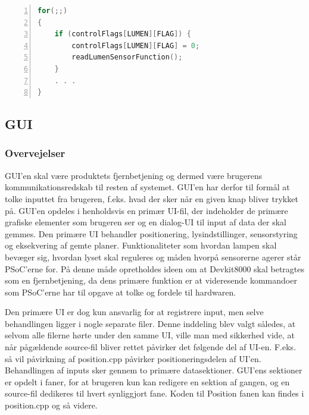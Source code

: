 \begin{lstlisting}[frame=single, basicstyle=\footnotesize\ttfamily, language=C, numbers=left, numberstyle=\tiny\color{black}, caption={Pseudokode: Flag i hovedløkken},captionpos=b]
for(;;)
{
    if (controlFlags[LUMEN][FLAG]) {
        controlFlags[LUMEN][FLAG] = 0;
        readLumenSensorFunction();
    }
	. . . 
}
\end{lstlisting}

\subsection{GUI}

\subsubsection{Overvejelser}

GUI’en skal være produktets fjernbetjening og dermed være brugerens kommunikationsredskab til resten af systemet. GUI’en har derfor til formål at tolke inputtet fra brugeren, f.eks. hvad der sker når en given knap bliver trykket på. 
GUI’en opdeles i henholdsvis en primær UI-fil, der indeholder de primære grafiske elementer som brugeren ser og en dialog-UI til input af data der skal gemmes. Den primære UI behandler positionering, lysindstillinger, sensorstyring og eksekvering af gemte planer. Funktionaliteter som hvordan lampen skal bevæger sig, hvordan lyset skal reguleres og måden hvorpå sensorerne agerer står PSoC'erne for. På denne måde opretholdes ideen om at Devkit8000 skal betragtes som en fjernbetjening, da dens primære funktion er at videresende kommandoer som PSoC'erne har til opgave at tolke og fordele til hardwaren.
\newline

Den primære UI er dog kun ansvarlig for at registrere input, men selve behandlingen ligger i nogle separate filer. Denne inddeling blev valgt således, at selvom alle filerne hørte under den samme UI, ville man med sikkerhed vide, at når pågældende source-fil bliver rettet påvirker det følgende del af UI-en. F.eks. så vil påvirkning af position.cpp påvirker positioneringsdelen af UI'en. Behandlingen af inputs sker gennem to primære datasektioner. GUI’ens sektioner er opdelt i faner, for at brugeren kun kan redigere en sektion af gangen, og en source-fil dedikeres til hvert synliggjort fane. Koden til Position fanen kan findes i position.cpp og så videre.
\newline 

